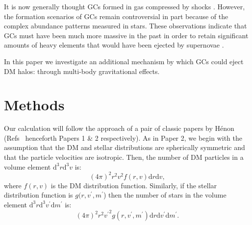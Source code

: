 \documentclass[aps,floatfix,prd,showpacs]{revtex4}
\newcommand{\diff}{\mathrm{d}}
\newcommand{\vp}{v^\prime}
\newcommand{\mpr}{m^\prime}
\begin{document}
It is now generally thought GCs formed in gas compressed by shocks \cite{Gunn1980,Harris1994}.  However, the formation scenarios of GCs remain controversial in part because of the complex abundance patterns measured in stars.  These observations indicate that GCs must have been much more massive in the past in order to retain significant amounts of heavy elements that would have been ejected by supernovae \cite{Gratton,Gratton2012,Con&Sperg}.




In this paper we investigate an additional mechanism by which GCs could eject DM halos:  through multi-body gravitational effects.  





\section{Methods}
\label{section:methods}


Our calculation will follow the approach of a pair of classic papers by H\'{e}non (Refs~\cite{HenonA,HenonB} henceforth Papers 1 \& 2 respectively).  As in Paper 2, we begin with the assumption that the DM and stellar distributions are spherically symmetric and that the particle velocities are isotropic.  Then, the number of DM particles in a volume element $\diff^3r\diff^3v$ is:
%
\begin{equation}
(4\pi)^2r^2v^2f(r,v)\diff r\diff v,
\end{equation}
%
%
where $f(r,v)$ is the DM distribution function.  Similarly, if the stellar distribution function is $g(r,\vp,\mpr$) then the number of stars in the volume element $\diff^3r\diff^3\vp \diff \mpr$ is:
%
\begin{equation}
(4\pi)^2r^2{\vp}^2g(r,\vp,\mpr)\diff r\diff \vp \diff \mpr.
\end{equation}
%
%
\end{document}
